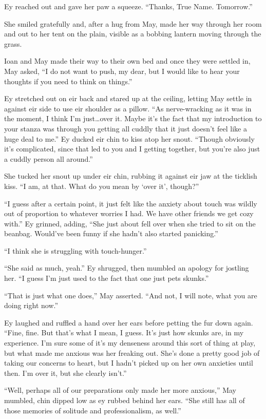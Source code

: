 Ey reached out and gave her paw a squeeze. ``Thanks, True Name. Tomorrow.''

She smiled gratefully and, after a hug from May, made her way through her room and out to her tent on the plain, visible as a bobbing lantern moving through the grass.

Ioan and May made their way to their own bed and once they were settled in, May asked, ``I do not want to push, my dear, but I would like to hear your thoughts if you need to think on things.''

Ey stretched out on eir back and stared up at the ceiling, letting May settle in against eir side to use eir shoulder as a pillow. ``As nerve-wracking as it was in the moment, I think I'm just\ldots over it. Maybe it's the fact that my introduction to your stanza was through you getting all cuddly that it just doesn't feel like a huge deal to me.'' Ey ducked eir chin to kiss atop her snout. ``Though obviously it's complicated, since that led to you and I getting together, but you're also just a cuddly person all around.''

She tucked her snout up under eir chin, rubbing it against eir jaw at the ticklish kiss. ``I am, at that. What do you mean by `over it', though?''

``I guess after a certain point, it just felt like the anxiety about touch was wildly out of proportion to whatever worries I had. We have other friends we get cozy with.'' Ey grinned, adding, ``She just about fell over when she tried to sit on the beanbag. Would've been funny if she hadn't also started panicking.''

``I think she is struggling with touch-hunger.''

``She said as much, yeah.'' Ey shrugged, then mumbled an apology for jostling her. ``I guess I'm just used to the fact that one just pets skunks.''

``That is just what one does,'' May asserted. ``And not, I will note, what you are doing right now.''

Ey laughed and ruffled a hand over her ears before petting the fur down again. ``Fine, fine. But that's what I mean, I guess. It's just how skunks are, in my experience. I'm sure some of it's my denseness around this sort of thing at play, but what made me anxious was her freaking out. She's done a pretty good job of taking our concerns to heart, but I hadn't picked up on her own anxieties until then. I'm over it, but she clearly isn't.''

``Well, perhaps all of our preparations only made her more anxious,'' May mumbled, chin dipped low as ey rubbed behind her ears. ``She still has all of those memories of solitude and professionalism, as well.''

